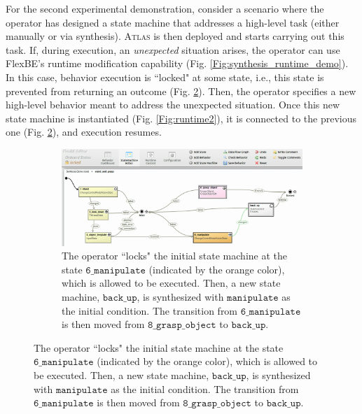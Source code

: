 For the second experimental demonstration, consider a scenario where the operator has designed a state machine that addresses a high-level task (either manually or via synthesis).
\textsc{Atlas} is then deployed and starts carrying out this task.
If, during execution, an \emph{unexpected} situation arises, the operator can use FlexBE's runtime modification capability (Fig. \ref{Fig:synthesis_runtime_demo}).
In this case, behavior execution is ``locked" at some state, i.e., this state is prevented from returning an outcome (Fig. \ref{Fig:runtime1}). 
Then, the operator specifies a new high-level behavior meant to address the unexpected situation.
Once this new state machine is instantiated (Fig. \ref{Fig:runtime2}), it is connected to the previous one (Fig. \ref{Fig:runtime1}), and execution resumes.

\begin{figure}[t]
	\centering
	\begin{subfigure}[b]{0.99\columnwidth}
	\includegraphics[width=0.99\columnwidth, clip]{./img/synthesis_runtime_connect_sm.png}
	\caption{The operator ``locks" the initial state machine at the state $\mathtt{6\_manipulate}$ (indicated by the orange color), which is allowed to be executed.
	Then, a new state machine, $\mathtt{back\_up}$, is synthesized with $\mathtt{manipulate}$ as the initial condition.
	The transition from $\mathtt{6\_manipulate}$ is then moved from $\mathtt{8\_grasp\_object}$ to $\mathtt{back\_up}$.
	} 
	\label{Fig:runtime1}
	\end{subfigure}
	

\end{figure}
